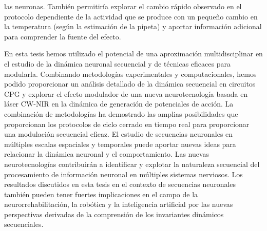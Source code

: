 las neuronas. También permitiría explorar el cambio rápido observado en el protocolo dependiente de la actividad que se produce con un pequeño cambio en la temperatura (según la estimación de la pipeta) y aportar información adicional para comprender la fuente del efecto.

En esta tesis hemos utilizado el potencial de una aproximación multidisciplinar en el estudio de la dinámica neuronal secuencial y de técnicas eficaces para modularla. Combinando metodologías experimentales y computacionales, hemos podido proporcionar un análisis detallado de la dinámica secuencial en circuitos CPG y explorar el efecto modulador de una nueva neurotecnología basada en láser CW-NIR en la  dinámica de generación de potenciales de acción. La combinación de metodologías ha demostrado las amplias posibilidades que proporcionan los protocolos de ciclo cerrado en tiempo real para proporcionar una modulación secuencial eficaz. El estudio de secuencias neuronales en múltiples escalas espaciales y temporales puede aportar nuevas ideas para relacionar la dinámica neuronal y el comportamiento. Las nuevas neurotecnologías contribuirán a identificar y explotar la naturaleza secuencial del procesamiento de información neuronal en múltiples sistemas nerviosos. Los resultados discutidos en esta tesis en el contexto de secuencias neuronales también pueden tener fuertes implicaciones en el campo de la neurorrehabilitación, la robótica y la inteligencia artificial por las nuevas perspectivas derivadas de la comprensión de los invariantes dinámicos secuenciales.